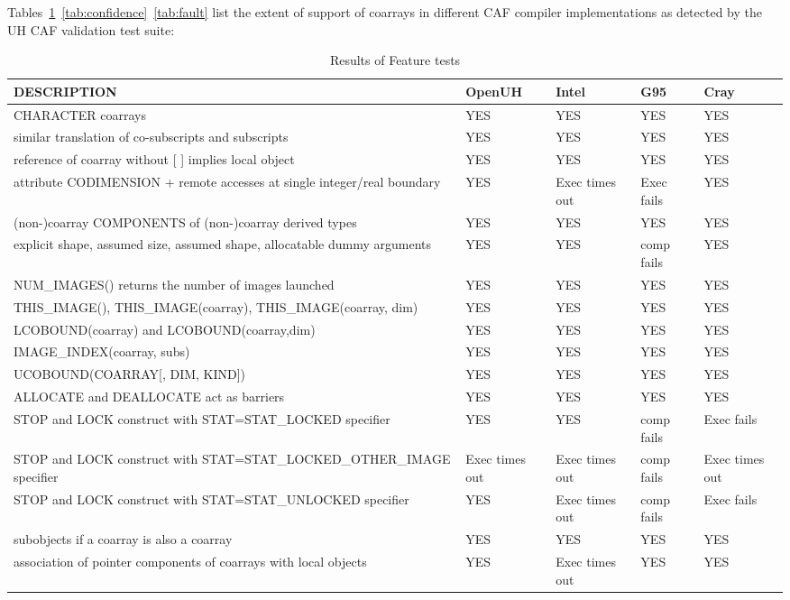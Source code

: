 Tables~\ref{tab:feature}~\ref{tab:confidence}~\ref{tab:fault} list the extent of support of coarrays in different CAF compiler implementations as detected by the UH CAF validation test suite:

\begin{table}[tbh!]
\small
\caption{Results of Feature tests}
\label{tab:feature}
\begin{tabular}{|p{7cm}|p{1.5cm}|p{1.5cm}|p{1.5cm}|p{1.5cm}|}
\hline
DESCRIPTION  & OpenUH & Intel & G95 & Cray\\\hline
CHARACTER coarrays & YES & YES & YES & YES\\\hline
similar translation of co-subscripts and subscripts & YES & YES & YES & YES\\\hline
reference of coarray without [ ] implies local object & YES & YES & YES & YES\\\hline
attribute CODIMENSION + remote accesses at single integer/real boundary & YES & Exec times out & Exec fails & YES\\\hline
(non-)coarray COMPONENTS of (non-)coarray derived types & YES & YES & YES & YES\\\hline
explicit shape, assumed size, assumed shape, allocatable dummy arguments & YES & YES & comp fails& YES\\\hline
NUM\_IMAGES() returns the number of images launched & YES & YES & YES & YES\\\hline
THIS\_IMAGE(), THIS\_IMAGE(coarray), THIS\_IMAGE(coarray, dim) & YES & YES & YES &YES\\\hline
LCOBOUND(coarray) and LCOBOUND(coarray,dim) & YES & YES & YES & YES\\\hline
IMAGE\_INDEX(coarray, subs) & YES & YES & YES & YES\\\hline
UCOBOUND(COARRAY[, DIM, KIND]) & YES & YES & YES& YES\\\hline
ALLOCATE and DEALLOCATE act as barriers & YES & YES & YES & YES\\\hline
STOP and LOCK construct with STAT=STAT\_LOCKED specifier & YES & YES & comp fails & Exec fails\\\hline
STOP and LOCK construct with STAT=STAT\_LOCKED\_OTHER\_IMAGE specifier & Exec times out & Exec times out & comp fails & Exec times out\\\hline
STOP and LOCK construct with STAT=STAT\_UNLOCKED specifier & YES & Exec times out & comp fails& Exec fails\\\hline
subobjects if a coarray is also a coarray & YES & YES & YES& YES\\\hline
association of pointer components of coarrays with local objects & YES & Exec times out & YES & YES\\\hline
\end{tabular}
\end{table}

